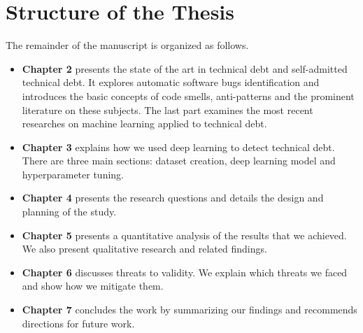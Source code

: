 \section{Structure of the Thesis}
The remainder of the manuscript is organized as follows.
\begin{itemize}
 \item \textbf{Chapter 2} presents the state of the art in technical debt and self-admitted technical debt. It explores automatic software bugs identification and introduces the basic concepts of code smells, anti-patterns and the prominent literature on these subjects. The last part examines the most recent researches on machine learning applied to technical debt.
 \item \textbf{Chapter 3} explains how we used deep learning to detect technical debt. There are three main sections: dataset creation, deep learning model and hyperparameter tuning.
 \item \textbf{Chapter 4} presents the research questions and details the design and planning of the study.
 \item \textbf{Chapter 5} presents a quantitative analysis of the results that we achieved. We also present qualitative research and related findings.
 \item \textbf{Chapter 6} discusses  threats to validity. We explain which threats we faced and show how we mitigate them.
 \item \textbf{Chapter 7} concludes the work by summarizing our findings and recommends directions for future work.
\end{itemize}











